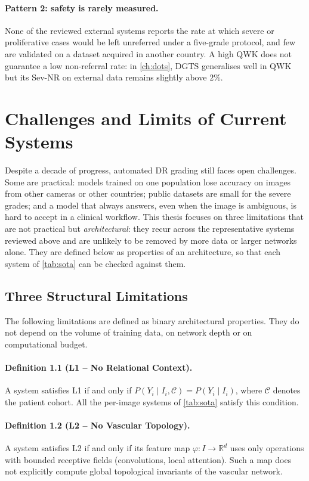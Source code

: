 \paragraph{Pattern 2: safety is rarely measured.}
None of the reviewed external systems reports the rate at which severe or proliferative
cases would be left unreferred under a five-grade protocol, and few are validated on a
dataset acquired in another country. A high QWK does not guarantee a low non-referral
rate: in \cref{ch:dots}, DGTS generalises well in QWK but its Sev-NR on external data
remains slightly above $2\%$.

\section{Challenges and Limits of Current Systems}
\label{sec:challenges}

Despite a decade of progress, automated DR grading still faces open challenges. Some are
practical: models trained on one population lose accuracy on images from other cameras or
other countries; public datasets are small for the severe grades; and a model that always
answers, even when the image is ambiguous, is hard to accept in a clinical workflow. This
thesis focuses on three limitations that are not practical but \emph{architectural}: they
recur across the representative systems reviewed above and are unlikely to be removed by
more data or larger networks alone. They are defined below as properties of an
architecture, so that each system of \cref{tab:sota} can be checked against them.

\subsection{Three Structural Limitations}
\label{sec:limits}

The following limitations are defined as binary architectural properties. They do not
depend on the volume of training data, on network depth or on computational budget.

\paragraph{Definition 1.1 (L1 -- No Relational Context).}
A system satisfies L1 if and only if $P(Y_i \mid I_i, \mathcal{C}) = P(Y_i \mid I_i)$,
where $\mathcal{C}$ denotes the patient cohort. All the per-image systems of
\cref{tab:sota} satisfy this condition.

\paragraph{Definition 1.2 (L2 -- No Vascular Topology).}
A system satisfies L2 if and only if its feature map $\varphi : I \to \mathbb{R}^d$ uses
only operations with bounded receptive fields (convolutions, local attention). Such a
map does not explicitly compute global topological invariants of the vascular network.

